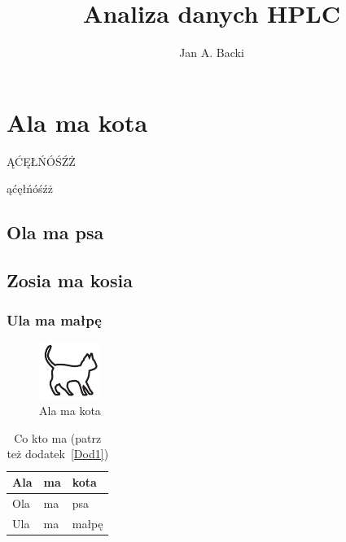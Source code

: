 \documentclass[magister,druk,ramka,polski]{dyplom}
\author{Jan A. Backi}
\title{Analiza danych HPLC}
\begin{document}
\maketitle
\tableofcontents
\listoffigures
\listoftables





\chapter{Ala ma kota}

ĄĆĘŁŃÓŚŹŻ

ąćęłńóśźż

\lipsum[1]

\section{Ola ma psa}

\lipsum[2-3]

\section{Zosia ma kosia}

\lipsum[7]

\subsection{Ula ma małpę}

\lipsum[4-10]

\begin{figure}
\includegraphics[width=.4\textwidth]{kotek}
\caption{Ala ma kota}
\end{figure}

\lipsum[11-15]

\begin{table}
\caption{Co kto ma \cite{harel_rzecz_2008} (patrz też dodatek~\ref{Dod1})}
\begin{tabular}{|l|l|l|}
\hline
Ala & ma & kota \\
\hline
Ola & ma & psa \\
\hline
Ula & ma & małpę\\
\hline
\end{tabular}
\end{table}
\end{document}
